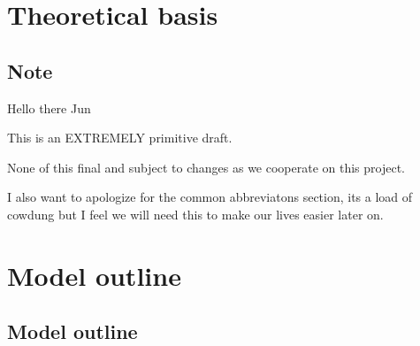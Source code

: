 \documentclass[a4paper, 12pt]{report}
\theoremstyle{definition}
\begin{document}
\newpage

\chapter{Theoretical basis}
\section{Note}
Hello there Jun

\noindent
This is an \textsc{\huge EXTREMELY} primitive draft.

\noindent
None of this final and subject to changes as we cooperate on this project.

\noindent
I also want to apologize for the common abbreviatons section, its a load of cowdung
but I feel we will need this to make our lives easier later on.

\chapter{Model outline}
\section{Model outline}
\end{document}
